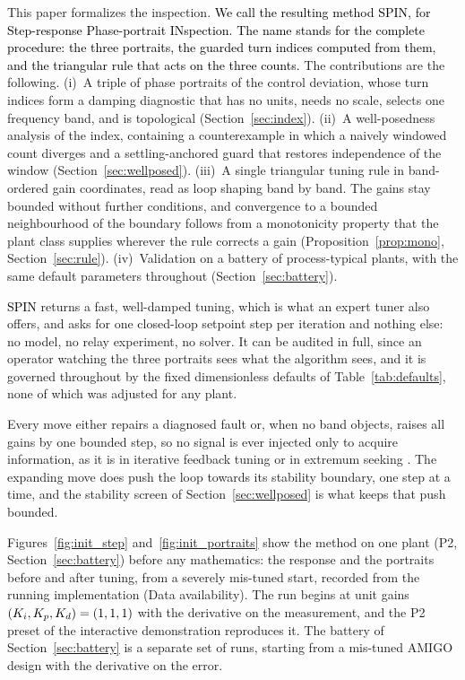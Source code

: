 \documentclass[final,3p,times,twocolumn]{elsarticle}
\newcommand{\spin}{SPIN\xspace}
\newcommand{\new}[1]{\textcolor{black}{#1}}  %
\begin{document}
This paper formalizes the inspection. \new{We call the resulting
method \spin, for Step-response Phase-portrait INspection. The name
stands for the complete procedure: the three portraits, the guarded
turn indices computed from them, and the triangular rule that acts on
the three counts.} The contributions are the following.
(i)~A triple of phase portraits of the control deviation, whose turn
indices form a damping diagnostic that has no units, needs no scale,
selects one frequency band, and is topological
(Section~\ref{sec:index}).
(ii)~A well-posedness analysis of the index, containing a
counterexample in which a naively windowed count diverges and a
settling-anchored guard that restores independence of the window
(Section~\ref{sec:wellposed}).
(iii)~A single triangular tuning rule in band-ordered gain coordinates,
read as loop shaping band by band. The gains stay bounded without
further conditions, and convergence to a bounded neighbourhood of the
boundary follows from a monotonicity property that the plant class
supplies wherever the rule corrects a gain
(Proposition~\ref{prop:mono}, Section~\ref{sec:rule}).
(iv)~Validation on a battery of process-typical plants, with the same
default parameters throughout (Section~\ref{sec:battery}).

\new{\spin} returns a fast, well-damped tuning, which is what an expert
tuner also offers, and asks for one closed-loop setpoint step per
iteration and nothing else: no model, no relay experiment, no solver. It
can be audited in full, since an operator watching the three portraits
sees what the algorithm sees, and it is governed throughout by the fixed
dimensionless defaults of Table~\ref{tab:defaults}, none of which was
adjusted for any plant.

Every move either repairs a diagnosed fault or, when no band objects,
raises all gains by one bounded step, so no signal is ever injected
only to acquire information, as it is in iterative feedback tuning or in
extremum seeking \cite{HjalmarssonIFT,KillingsworthKrstic}. The
expanding move does push the loop towards its stability boundary, one
step at a time, and the stability screen of
Section~\ref{sec:wellposed} is what keeps that push bounded.

Figures~\ref{fig:init_step} and~\ref{fig:init_portraits} show the
method on one plant (P2, Section~\ref{sec:battery}) before any
mathematics: the response and the portraits before and after tuning,
from a severely mis-tuned start, recorded from the running
implementation (Data availability). The run begins at unit gains
$\new{(K_i, K_p, K_d)} = (1, 1, 1)$ with the derivative on the
measurement, and the P2 preset of the interactive demonstration
reproduces it. The battery of Section~\ref{sec:battery} is a separate
set of runs, starting from a mis-tuned AMIGO design with the derivative
on the error.
\end{document}
